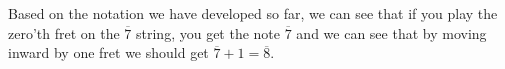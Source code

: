 \documentclass[preview]{standalone}
\begin{document}
\begin{center}
Based on the notation we have developed so far, we can see that if you play the zero'th fret on the $\overline{7}$ string, you get the note $\overline{7}$ and  we can see that by moving inward by one fret we should get $\overline{7} + 1 = \overline{8}$.
\end{center}
\end{document}
